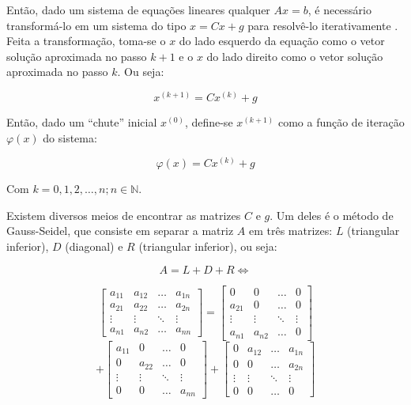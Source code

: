 \documentclass[twocolumn, 10pt]{extarticle}
\begin{document}
Então, dado um sistema de equações lineares qualquer $Ax = b$, é necessário transformá-lo em um sistema do tipo $x = Cx + g$ para resolvê-lo iterativamente \cite[p. 167]{ruggiero}. Feita a transformação, toma-se o $x$ do lado esquerdo da equação como o vetor solução aproximada no passo $k+1$ e o $x$ do lado direito como o vetor solução aproximada no passo $k$. Ou seja:

\[
x^{(k+1)} = Cx^{(k)}+g
\]

Então, dado um ``chute'' inicial $x^{(0)}$, define-se $x^{(k+1)}$ como a função de iteração $\varphi(x)$ do sistema:

\[
\varphi(x) = Cx^{(k)}+g
\]

Com $k = 0, 1, 2, \dots, n; n \in \mathbb{N} $.

Existem diversos meios de encontrar as matrizes $C$ e $g$. Um deles é o método de Gauss-Seidel, que consiste em separar a matriz $A$ em três matrizes: $L$ (triangular inferior), $D$ (diagonal) e $R$ (triangular inferior), ou seja:

\[A = L + D + R \iff\]

\[
\begin{bmatrix}
a_{11} & a_{12} & \dots & a_{1n} \\
a_{21} & a_{22} & \dots & a_{2n} \\
\vdots & \vdots & \ddots & \vdots \\
a_{n1} & a_{n2} & \dots & a_{nn}  
\end{bmatrix}
=
\begin{bmatrix}
0 & 0 & \dots & 0 \\
a_{21} & 0 & \dots & 0 \\
\vdots & \vdots & \ddots & \vdots \\
a_{n1} & a_{n2} & \dots & 0  
\end{bmatrix}
\]
\[
+
\begin{bmatrix}
a_{11} & 0 & \dots & 0 \\
0 & a_{22} & \dots & 0 \\
\vdots & \vdots & \ddots & \vdots \\
0 & 0 & \dots & a_{nn}  
\end{bmatrix}
+
\begin{bmatrix}
0 & a_{12} & \dots & a_{1n} \\
0 & 0 & \dots & a_{2n} \\
\vdots & \vdots & \ddots & \vdots \\
0 & 0 & \dots & 0 
\end{bmatrix}
\]
\end{document}
